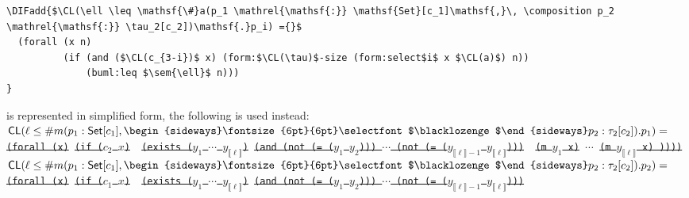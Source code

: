 \documentclass[10pt,fleqn,final]{scrreprt}
\newcommand*{\CL}{\ensuremath{\mathsf{CL}}\xspace}
\newenvironment{definitions}[0]{\medskip }{}
\newcommand{\composition}{\raisebox{0.2pt}{\begin{sideways}\fontsize{6pt}{6pt}\selectfont$\blacklozenge$\end{sideways}}}
\newcommand{\sem}[1]{\mathopen\llbracket#1\mathclose\rrbracket}
\newcommand{\white}[1]{{\color{white}{#1}}}
\newcommand{\qqquad}{\white{x}\qquad}
\providecommand{\DIFadd}[1]{{\protect\color{blue}\uwave{#1}}} %
\providecommand{\DIFdel}[1]{{\protect\color{red}\sout{#1}}}                      %
\providecommand{\DIFaddend}{} %
\providecommand{\DIFdelbegin}{} %
\begin{document}
\begin{definitions}
\begin{lstlisting}[language=clif, mathescape]
\DIFadd{$\CL(\ell \leq \mathsf{\#}a(p_1 \mathrel{\mathsf{:}} \mathsf{Set}[c_1]\mathsf{,}\, \composition p_2 \mathrel{\mathsf{:}} \tau_2[c_2])\mathsf{.}p_i) ={}$
  (forall (x n)
          (if (and ($\CL(c_{3-i})$ x) (form:$\CL(\tau)$-size (form:select$i$ x $\CL(a)$) n))
              (buml:leq $\sem{\ell}$ n)))
}\end{lstlisting}

\noindent \DIFadd{If $a$
}\DIFaddend is represented in simplified form, the following is used instead:
\DIFdelbegin %
\DIFdel{$\CL(\ell \leq \mathsf{\#}m(p_1 \mathrel{\mathsf{:}} \mathsf{Set}[c_1]\mathsf{,}\, \composition p_2 \mathrel{\mathsf{:}} \tau_2[c_2])\mathsf{.}p_1)=$}%
\texttt{\DIFdel{(forall (x)}%
\DIFdel{(if ($c_2$ $x$) }%
\DIFdel{(exists ($y_1$ $\cdots$ $y_{\sem{\ell}}$)}%
\DIFdel{(and (not (= ($y_1$ $y_2$))) $\cdots$  (not (= ($y_{\sem{\ell}-1}$ $y_{\sem{\ell}}$))) }%
\DIFdel{(m $y_1$ x)}%
\DIFdel{$\cdots$}%
\DIFdel{(m $y_{\sem{\ell}}$ x) ))))}}%
\DIFdel{$\CL(\ell \leq \mathsf{\#}m(p_1 \mathrel{\mathsf{:}} \mathsf{Set}[c_1]\mathsf{,}\, \composition p_2 \mathrel{\mathsf{:}} \tau_2[c_2])\mathsf{.}p_2)=$}%
\texttt{\DIFdel{(forall (x)}%
\DIFdel{(if ($c_1$ $x$) }%
\DIFdel{(exists ($y_1$ $\cdots$ $y_{\sem{\ell}}$)}%
\DIFdel{(and (not (= ($y_1$ $y_2$))) $\cdots$  (not (= ($y_{\sem{\ell}-1}$ $y_{\sem{\ell}}$))) }%
}
\end{definitions}
\end{document}
